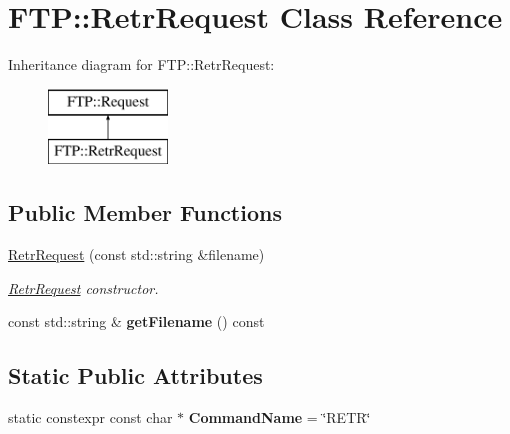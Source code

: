 \hypertarget{class_f_t_p_1_1_retr_request}{\section{F\-T\-P\-:\-:Retr\-Request Class Reference}
\label{class_f_t_p_1_1_retr_request}
}
Inheritance diagram for F\-T\-P\-:\-:Retr\-Request\-:\begin{figure}[H]
\begin{center}
\leavevmode
\includegraphics[height=2.000000cm]{class_f_t_p_1_1_retr_request}
\end{center}
\end{figure}
\subsection*{Public Member Functions}
\begin{DoxyCompactItemize}
\item 
\hyperlink{class_f_t_p_1_1_retr_request_a97bf717da1cf5ef47cd08d09db7fcb77}{Retr\-Request} (const std\-::string \&filename)
\begin{DoxyCompactList}\small\item\em \hyperlink{class_f_t_p_1_1_retr_request}{Retr\-Request} constructor. \end{DoxyCompactList}\item 
\hypertarget{class_f_t_p_1_1_retr_request_a3c558dccb6b1efac1138e31c4957c524}{const std\-::string \& {\bfseries get\-Filename} () const }\label{class_f_t_p_1_1_retr_request_a3c558dccb6b1efac1138e31c4957c524}

\end{DoxyCompactItemize}
\subsection*{Static Public Attributes}
\begin{DoxyCompactItemize}
\item 
\hypertarget{class_f_t_p_1_1_retr_request_ad28da02570e40fac7f7ae3136b71acdf}{static constexpr const char $\ast$ {\bfseries Command\-Name} = \char`\"{}R\-E\-T\-R\char`\"{}}\label{class_f_t_p_1_1_retr_request_ad28da02570e40fac7f7ae3136b71acdf}

\end{DoxyCompactItemize}


